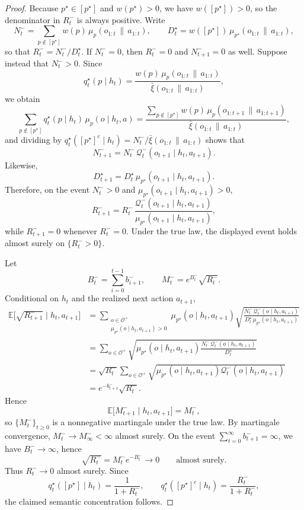 \documentclass[11pt]{article}
\theoremstyle{remark}
\newcommand{\Ocal}{\mathcal{O}}
\newcommand{\Qcal}{\mathcal{Q}}
\newcommand{\E}{\mathbb{E}}
\newcommand{\givena}{\,\|\,}
\newcommand{\barxi}{\bar{\xi}}
\begin{document}
\begin{proof}
Because \(p^\star \in [p^\star]\) and \(w(p^\star)>0\), we have \(w([p^\star])>0\), so the denominator in \(R_t^-\) is always positive. Write
\[
N_t^- = \sum_{p \notin [p^\star]} w(p)\,\mu_p(o_{1:t}\givena a_{1:t}),
\qquad
D_t^\star = w([p^\star])\,\mu_{p^\star}(o_{1:t}\givena a_{1:t}),
\]
so that \(R_t^- = N_t^- / D_t^\star\). If \(N_t^-=0\), then \(R_t^-=0\) and \(N_{t+1}^-=0\) as well. Suppose instead that \(N_t^->0\). Since
\[
q_t^\star(p\mid h_t)
=
\frac{
w(p)\,\mu_p(o_{1:t}\givena a_{1:t})
}{
\barxi(o_{1:t}\givena a_{1:t})
},
\]
we obtain
\[
\sum_{p \notin [p^\star]} q_t^\star(p\mid h_t)\,\mu_p(o\mid h_t,a)
=
\frac{
\sum_{p \notin [p^\star]} w(p)\,\mu_p(o_{1:t+1}\givena a_{1:t+1})
}{
\barxi(o_{1:t}\givena a_{1:t})
},
\]
and dividing by \(q_t^\star([p^\star]^c\mid h_t)=N_t^- / \barxi(o_{1:t}\givena a_{1:t})\) shows that
\[
N_{t+1}^- = N_t^-\,\Qcal_t^-(o_{t+1}\mid h_t,a_{t+1}).
\]
Likewise,
\[
D_{t+1}^\star = D_t^\star\,\mu_{p^\star}(o_{t+1}\mid h_t,a_{t+1}).
\]
Therefore, on the event \(N_t^->0\) and \(\mu_{p^\star}(o_{t+1}\mid h_t,a_{t+1})>0\),
\[
R_{t+1}^-
=
R_t^-\,
\frac{\Qcal_t^-(o_{t+1}\mid h_t,a_{t+1})}
{\mu_{p^\star}(o_{t+1}\mid h_t,a_{t+1})},
\]
while \(R_{t+1}^-=0\) whenever \(R_t^-=0\). Under the true law, the displayed event holds almost surely on \(\{R_t^->0\}\).

Let
\[
B_t^- = \sum_{i=0}^{t-1} b_{i+1}^-,
\qquad
M_t^- = e^{B_t^-}\sqrt{R_t^-}.
\]
Conditional on \(h_t\) and the realized next action \(a_{t+1}\),
\begin{align*}
\E\bigl[\sqrt{R_{t+1}^-}\mid h_t,a_{t+1}\bigr]
&=
\sum_{\substack{o \in \Ocal^+\\
\mu_{p^\star}(o\mid h_t,a_{t+1})>0}}
\mu_{p^\star}(o\mid h_t,a_{t+1})
\sqrt{\frac{N_t^-\,\Qcal_t^-(o\mid h_t,a_{t+1})}
{D_t^\star\,\mu_{p^\star}(o\mid h_t,a_{t+1})}} \\
&=
\sum_{o \in \Ocal^+}
\sqrt{
\mu_{p^\star}(o\mid h_t,a_{t+1})
\frac{N_t^-\,\Qcal_t^-(o\mid h_t,a_{t+1})}
{D_t^\star}
} \\
&=
\sqrt{R_t^-}
\sum_{o \in \Ocal^+}
\sqrt{
\mu_{p^\star}(o\mid h_t,a_{t+1})
\Qcal_t^-(o\mid h_t,a_{t+1})
} \\
&=
e^{-b_{t+1}^-}\sqrt{R_t^-}.
\end{align*}
Hence
\[
\E\bigl[M_{t+1}^-\mid h_t,a_{t+1}\bigr] = M_t^-,
\]
so \(\{M_t^-\}_{t\ge0}\) is a nonnegative martingale under the true law. By martingale convergence, \(M_t^- \to M_\infty^- < \infty\) almost surely. On the event \(\sum_{t=0}^{\infty} b_{t+1}^- = \infty\), we have \(B_t^- \to \infty\), hence
\[
\sqrt{R_t^-} = M_t^- e^{-B_t^-} \to 0
\qquad\text{almost surely.}
\]
Thus \(R_t^- \to 0\) almost surely. Since
\[
q_t^\star([p^\star]\mid h_t)
=
\frac{1}{1+R_t^-},
\qquad
q_t^\star([p^\star]^c\mid h_t)
=
\frac{R_t^-}{1+R_t^-},
\]
the claimed semantic concentration follows.
\end{proof}
\end{document}
